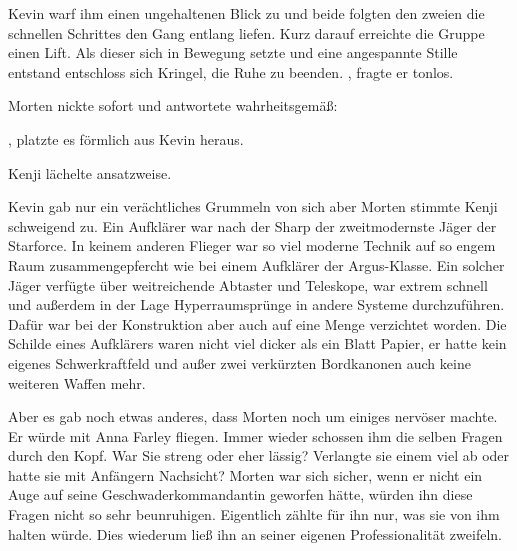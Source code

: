 
\par

Kevin warf ihm einen ungehaltenen Blick zu und beide folgten den zweien die schnellen Schrittes den Gang entlang liefen. Kurz darauf erreichte die Gruppe einen Lift. Als dieser sich in Bewegung setzte und eine angespannte Stille entstand entschloss sich Kringel, die Ruhe zu beenden. , fragte er tonlos.

\par

Morten nickte sofort und antwortete wahrheitsgemäß: 

\par

, platzte es förmlich aus Kevin heraus. 

\par

Kenji lächelte ansatzweise. 

\par

Kevin gab nur ein verächtliches Grummeln von sich aber Morten stimmte Kenji schweigend zu. Ein Aufklärer war nach der Sharp der zweitmodernste Jäger der Starforce. In keinem anderen Flieger war so viel moderne Technik auf so engem Raum zusammengepfercht wie bei einem Aufklärer der Argus-Klasse. Ein solcher Jäger verfügte über weitreichende Abtaster und Teleskope, war extrem schnell und außerdem in der Lage Hyperraumsprünge in andere Systeme durchzuführen. Dafür war bei der Konstruktion aber auch auf eine Menge verzichtet worden. Die Schilde eines Aufklärers waren nicht viel dicker als ein Blatt Papier, er hatte kein eigenes Schwerkraftfeld und außer zwei verkürzten Bordkanonen auch keine weiteren Waffen mehr.

\par

Aber es gab noch etwas anderes, dass Morten noch um einiges nervöser machte. Er würde mit Anna Farley fliegen. Immer wieder schossen ihm die selben Fragen durch den Kopf. War Sie streng oder eher lässig? Verlangte sie einem viel ab oder hatte sie mit Anfängern Nachsicht? Morten war sich sicher, wenn er nicht ein Auge auf seine Geschwaderkommandantin geworfen hätte, würden ihn diese Fragen nicht so sehr beunruhigen. Eigentlich zählte für ihn nur, was sie von ihm halten würde. Dies wiederum ließ ihn an seiner eigenen Professionalität zweifeln.

